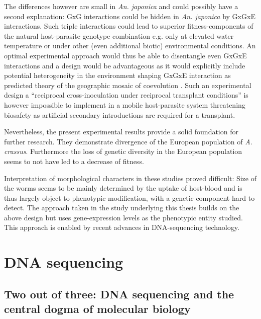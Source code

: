 The differences however are small in \textit{An. japonica} and could
possibly have a second explanation: GxG interactions could be hidden
in \textit{An. japonica} by GxGxE interactions. Such triple
interactions could lead to superior fitness-components of the natural
host-parasite genotype combination e.g. only at elevated water
temperature or under other (even additional biotic) environmental
conditions. An optimal experimental approach would thus be able to
disentangle even GxGxE interactions and a design would be advantageous
as it would explicitly include potential heterogeneity in the
environment shaping GxGxE interaction as predicted theory of the
geographic mosaic of coevolution \cite{thompson2005geographic}. Such
an experimental design a ``reciprocal cross-inoculation under
reciprocal transplant conditions'' \cite{pmid18419564} is however
impossible to implement in a mobile host-parasite system threatening
biosafety as artificial secondary introductions are required for a
transplant.

Nevertheless, the present experimental results provide a solid
foundation for further research. They demonstrate divergence of the
European population of \textit{A. crassus}. Furthermore the loss of
genetic diversity in the European population
\cite{wielgoss_population_2008} seems to not have led to a decrease of
fitness.

Interpretation of morphological characters in these studies proved
difficult: Size of the worms seems to be mainly determined by the
uptake of host-blood and is thus largely object to phenotypic
modification, with a genetic component hard to detect. The approach
taken in the study underlying this thesis builds on the above design
but uses gene-expression levels as the phenotypic entity studied. This
approach is enabled by recent advances in DNA-sequencing technology.

\section{DNA sequencing}

\subsection{Two out of three: DNA sequencing and the central dogma of
  molecular biology}
\label{sec:dm}



